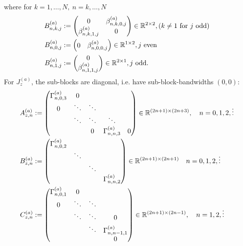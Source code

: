 \documentclass[11pt, oneside]{article}   	%
\begin{document}
where for $k = 1,\dots,N, \: n = k,\dots,N$  
\begin{align*}
	B^{(a)}_{n,k,j} &:= 
		\begin{pmatrix}
			0 & \beta^{(a)}_{n,k,0,j} \\
			\beta^{(a)}_{n,k,1,j} & 0
		\end{pmatrix} \in \mathbb{R}^{2\times2}, (k \ne 1 \text { for } j \text{ odd}) \\
	B^{(a)}_{n,0,j} &:=
		\begin{pmatrix}
			0 & \beta^{(a)}_{n,0,0,j}
		\end{pmatrix} \in \mathbb{R}^{1\times2}, j \text{ even} \\
	B^{(a)}_{n,1,j} &:=
		\begin{pmatrix}
			0 \\
			\beta^{(a)}_{n,1,1,j}
		\end{pmatrix}\in \mathbb{R}^{2\times1}, j \text{ odd}.
\end{align*}
For $J_z^{(a)}$, the sub-blocks are diagonal, i.e. have sub-block-bandwidths $(0,0)$:
\begin{align*}
	A^{(a)}_{z,n} &:= 
		\begin{pmatrix}
			\Gamma^{(a)}_{n,0,3} & 0 & \\
			0 & \ddots & \ddots & & \\
			& \ddots & \ddots & \ddots & \\
			& & 0 & \Gamma^{(a)}_{n,n,3} & 0 \\
		\end{pmatrix} \in \mathbb{R}^{(2n+1)\times(2n+3)}, \quad n = 0,1,2,\vdots \\
	B^{(a)}_{z,n} &:= 
		\begin{pmatrix}
			\Gamma^{(a)}_{n,0,2} & \\
			& \ddots & & \\
			& & \ddots & \\
			& & & \Gamma^{(a)}_{n,n,2}
		\end{pmatrix} \in \mathbb{R}^{(2n+1)\times(2n+1)}  \quad n = 0,1,2,\vdots \\
	C^{(a)}_{z,n} &:= 
		\begin{pmatrix}
			\Gamma^{(a)}_{n,0,1} & 0 & & \\
			0 & \ddots & \ddots & \\
			& \ddots & \ddots & 0 \\
			& & \ddots & \Gamma^{(a)}_{n,n-1,1} \\
			& & & 0 \\
		\end{pmatrix} \in \mathbb{R}^{(2n+1)\times(2n-1)}, \quad n = 1,2,\vdots
\end{align*}
\end{document}
